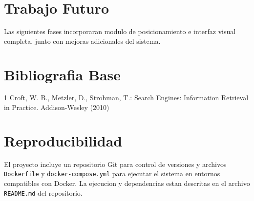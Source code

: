 \documentclass[runningheads]{llncs}
\begin{document}
\section{Trabajo Futuro}
Las siguientes fases incorporaran modulo de posicionamiento e interfaz visual
completa, junto con mejoras adicionales del sistema.

\section{Bibliografia Base}
\begin{thebibliography}{1}
Croft, W. B., Metzler, D., Strohman, T.:
Search Engines: Information Retrieval in Practice.
Addison-Wesley (2010)
\end{thebibliography}

\section{Reproducibilidad}
El proyecto incluye un repositorio Git para control de versiones y archivos
\texttt{Dockerfile} y \texttt{docker-compose.yml} para ejecutar el sistema en
entornos compatibles con Docker. La ejecucion y dependencias estan descritas
en el archivo \texttt{README.md} del repositorio.
\end{document}
